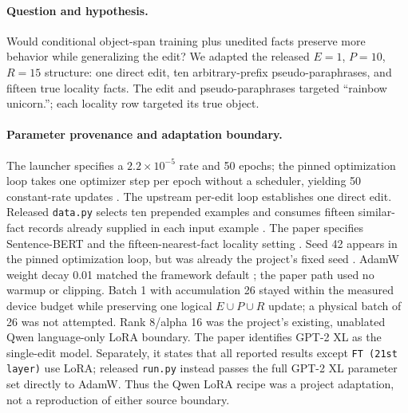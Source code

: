 \paragraph{Question and hypothesis.}
Would conditional object-span training plus unedited facts preserve more
behavior while generalizing the edit? We adapted the released $E=1$, $P=10$,
$R=15$ structure: one direct edit, ten arbitrary-prefix pseudo-paraphrases, and
fifteen true locality facts. The edit and pseudo-paraphrases targeted
``rainbow unicorn.''; each locality row targeted its true object.
\citep{gangadhar2024model,gangadhar2024data}

\paragraph{Parameter provenance and adaptation boundary.}
The launcher specifies a $2.2\times10^{-5}$ rate and 50 epochs; the pinned
optimization loop takes one optimizer step per epoch without a scheduler,
yielding 50 constant-rate updates
\citep{gangadhar2024launcher,gangadhar2024run}. The upstream per-edit loop
establishes one direct edit. Released \texttt{data.py} selects ten prepended
examples and consumes fifteen similar-fact records already supplied in each
input example \citep{gangadhar2024run,gangadhar2024data}. The paper specifies
Sentence-BERT and the fifteen-nearest-fact locality setting
\citep{gangadhar2024model}. Seed 42
appears in the pinned optimization loop, but was already the project's fixed
seed \citep{gangadhar2024run}. AdamW weight decay 0.01 matched the framework default
\citep{loshchilov2019adamw,pytorchadamw}; the paper path used no warmup or
clipping. Batch 1 with
accumulation 26 stayed within the measured device budget while preserving one
logical $E\cup P\cup R$ update; a physical batch of 26 was not attempted.
Rank 8/alpha 16 was the project's existing, unablated Qwen language-only LoRA
boundary. The paper identifies GPT-2 XL as the single-edit model. Separately,
it states that all reported results except \texttt{FT (21st layer)} use LoRA;
released \texttt{run.py} instead passes the full GPT-2 XL parameter set
directly to AdamW. Thus the Qwen LoRA recipe was a project adaptation, not a
reproduction of either source boundary.
\citep{gangadhar2024model,gangadhar2024run,gangadhar2024launcher}

